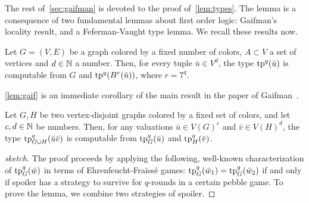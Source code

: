 
\medskip The rest of~\cref{sec:gaifman} is devoted to the proof of~\cref{lem:types}.
The lemma is a consequence of two fundamental lemmas about first order logic:
Gaifman's locality result, and a Feferman-Vaught type  lemma. We recall these results now.
\medskip



\begin{lemma}\label{lem:gaif}
  Let $G=(V,E)$ be a graph colored by a fixed number of colors, $A\subset V$ a set of vertices and $d\in \mathbb{N}$ a number.
  Then, for every tuple $\bar u\in V^d$, the type  $\mathrm{tp}^q(\bar u)$ is computable from $G$ and $\mathrm{tp}^q(B^r(\bar u))$, where $r=7^q$.
\end{lemma}
\cref{lem:gaif} is an immediate corollary of the main result in the paper of Gaifman~\cite{gaifman1982local}.



\begin{lemma}\label{lem:fv}
  Let $G,H$ be two vertex-disjoint  graphs colored by a fixed set of colors, and let 
  $c,d\in\mathbb{N}$  be numbers.
    Then, for any valuations
 $\bar u\in V(G)^{c}$ and $\bar v\in V(H)^{d}$, 
 the type 
 $\mathrm{tp}^q_{G\cup H}(\bar u\bar v)$
 is computable from $\mathrm{tp}^q_G(\bar u)$
 and $\mathrm{tp}^q_H(\bar v)$.
\end{lemma}
\begin{proof}[sketch]The proof proceeds by applying the following, well-known characterization of $\mathrm{tp}^q_G(\bar w)$ in terms of Ehrenfeucht-Fra\"iss\'e games:
$\mathrm{tp}^q_{G}(\bar w_1)=\mathrm{tp}^q_{G}(\bar w_2)$
if and only if spoiler has a strategy to survive for $q$-rounds in a certain pebble game.
To prove the lemma, we combine two strategies of spoiler.
\end{proof}


